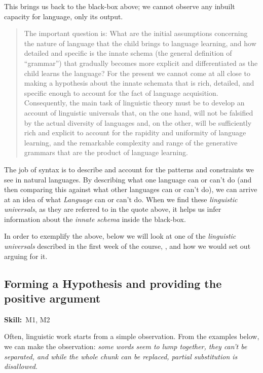 \documentclass{article}
\begin{document}
This brings us back to the black-box above; we cannot observe any inbuilt capacity for language, only its output.
\begin{quote}
    The important question is: What are the initial assumptions concerning the nature of language that the child brings to language learning, and how detailed and specific is the innate schema (the general definition of ``grammar'') that gradually becomes more explicit and differentiated as the child learns the language?
    For the present we cannot come at all close to making a hypothesis about the innate schemata that is rich, detailed, and specific enough to account for the fact of language acquisition.
    Consequently, the main task of linguistic theory must be to develop an account of linguistic universals that, on the one hand, will not be falsified by the actual diversity of languages and, on the other, will be sufficiently rich and explicit to account for the rapidity and uniformity of language learning, and the remarkable complexity and range of the generative grammars that are the product of language learning.
\end{quote}
The job of syntax is to describe and account for the patterns and constraints we see in natural languages.
By describing what one language can or can't do (and then comparing this against what other languages can or can't do), we can arrive at an idea of what \emph{Language} can or can't do.
When we find these \emph{linguistic universals}, as they are referred to in the quote above, it helps us infer information about the \emph{innate schema} inside the black-box.

In order to exemplify the  above, below we will look at one of the \emph{linguistic universals} described in the first week of the course, , and how we would set out arguing for it.

\subsection{Forming a Hypothesis and providing the positive argument}
\hfill{}\textbf{Skill:}~M1, M2%

Often, linguistic work starts from a simple observation. From the examples below, we can make the observation: \emph{some words seem to lump together, they can't be separated, and while the whole chunk can be replaced, partial substitution is disallowed}.
\end{document}
